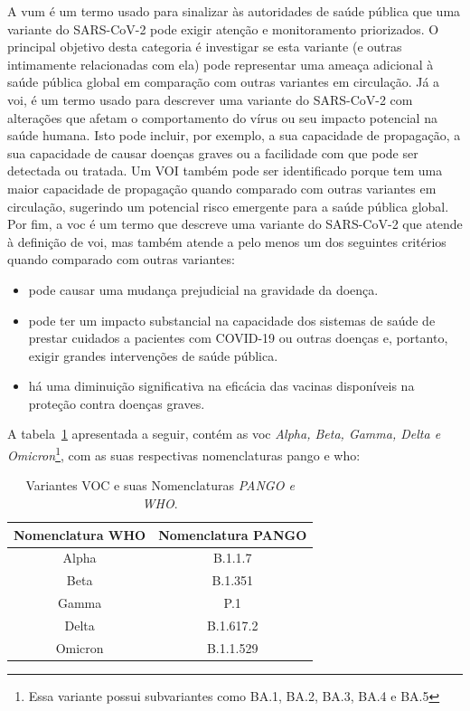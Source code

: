 A \gls{vum} é um termo usado para sinalizar às autoridades de saúde pública que uma variante do SARS-CoV-2 pode exigir atenção e monitoramento priorizados. O principal objetivo desta categoria é investigar se esta variante (e outras intimamente relacionadas com ela) pode representar uma ameaça adicional à saúde pública global em comparação com outras variantes em circulação.
Já a \gls{voi}, é um termo usado para descrever uma variante do SARS-CoV-2 com alterações que afetam o comportamento do vírus ou seu impacto potencial na saúde humana. Isto pode incluir, por exemplo, a sua capacidade de propagação, a sua capacidade de causar doenças graves ou a facilidade com que pode ser detectada ou tratada. Um VOI também pode ser identificado porque tem uma maior capacidade de propagação quando comparado com outras variantes em circulação, sugerindo um potencial risco emergente para a saúde pública global. Por fim, a \gls{voc} é um termo que descreve uma variante do SARS-CoV-2 que atende à definição de \gls{voi}, mas também atende a pelo menos um dos seguintes critérios quando comparado com outras variantes\cite{who_variants}:
\begin{itemize}
  \item pode causar uma mudança prejudicial na gravidade da doença.
  \item   pode ter um impacto substancial na capacidade dos sistemas de saúde de prestar cuidados a pacientes com COVID-19 ou outras doenças e, portanto, exigir grandes intervenções de saúde pública.
  \item há uma diminuição significativa na eficácia das vacinas disponíveis na proteção contra doenças graves.
\end{itemize}

A tabela~\ref{tab:nomenclaturaPangoWho} apresentada a seguir, contém as \gls{voc} \textit{Alpha, Beta, Gamma, Delta e Omicron}\footnote{Essa variante possui subvariantes como BA.1, BA.2, BA.3, BA.4 e BA.5}, com as suas respectivas nomenclaturas \gls{pango} e \gls{who}\cite{covid19_cascella_2020}:

\begin{table}[htb]
  \caption{Variantes VOC e suas Nomenclaturas \textit{PANGO e WHO}.}
  \begin{center}
    \begin{tabular}{c|c}
      \hline
      Nomenclatura WHO & Nomenclatura PANGO \\
      \hline
      Alpha            & B.1.1.7            \\
      Beta             & B.1.351            \\
      Gamma            & P.1                \\
      Delta            & B.1.617.2          \\
      Omicron          & B.1.1.529          \\
      \hline
    \end{tabular}
  \end{center}
  \label{tab:nomenclaturaPangoWho}
\end{table}


